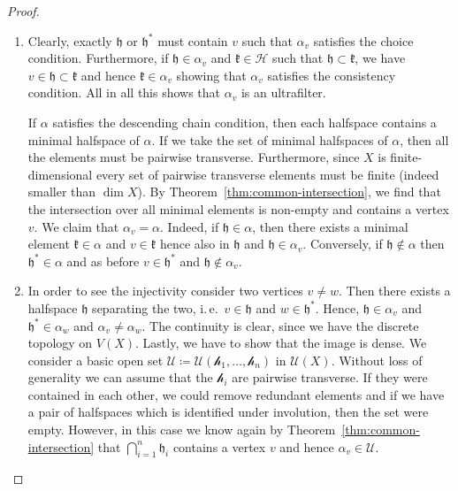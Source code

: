 \begin{proof}
  \begin{enumerate}
  \item Clearly, exactly \(\mathfrak{h}\) or \(\mathfrak{h}^\ast\) must contain \(v\) such that \(\alpha_v\) satisfies the choice condition. Furthermore, if \(\mathfrak{h} \in \alpha_v\) and \(\mathfrak{k} \in \mathcal{H}\) such that \(\mathfrak{h} \subset \mathfrak{k}\), we have \(v \in \mathfrak{h} \subset \mathfrak{k}\) and hence \(\mathfrak{k} \in \alpha_v\) showing that \(\alpha_v\) satisfies the consistency condition. All in all this shows that \(\alpha_v\) is an ultrafilter.

    If \(\alpha\) satisfies the descending chain condition, then each halfspace contains a minimal halfspace of \(\alpha\). If we take the set of minimal halfspaces of \(\alpha\), then all the elements must be pairwise transverse. Furthermore, since \(X\) is finite-dimensional every set of pairwise transverse elements must be finite (indeed smaller than \(\dim X\)). By Theorem~\ref{thm:common-intersection}, we find that the intersection over all minimal elements is non-empty and contains a vertex \(v\). We claim that \(\alpha_v = \alpha\). Indeed, if \(\mathfrak{h} \in \alpha\), then there exists a minimal element \(\mathfrak{k} \in \alpha\) and \(v \in \mathfrak{k}\) hence also in \(\mathfrak{h}\) and \(\mathfrak{h} \in \alpha_v\). Conversely, if \(\mathfrak{h} \not \in \alpha\) then \(\mathfrak{h}^\ast \in \alpha\) and as before \(v \in \mathfrak{h}^\ast\) and \(\mathfrak{h} \not \in \alpha_v\).
  \item In order to see the injectivity consider two vertices \(v \neq w\). Then there exists a halfspace \(\mathfrak{h}\) separating the two, i.\,e.\ \(v \in \mathfrak{h}\) and \(w \in \mathfrak{h}^\ast\). Hence, \(\mathfrak{h} \in \alpha_v\) and \(\mathfrak{h}^\ast \in \alpha_w\) and \(\alpha_v \neq \alpha_w\). The continuity is clear, since we have the discrete topology on \(V(X)\). Lastly, we have to show that the image is dense. We consider a basic open set \(\mathcal{U} \coloneqq \mathcal{U}(\mathcal{h}_1, \dots, \mathcal{h}_n)\) in \(\mathcal{U}(X)\). Without loss of generality we can assume that the \(\mathcal{h}_i\) are pairwise transverse. If they were contained in each other, we could remove redundant elements and if we have a pair of halfspaces which is identified under involution, then the set were empty. However, in this case we know again by Theorem~\ref{thm:common-intersection} that \(\bigcap_{i=1}^n \mathfrak{h}_i\) contains a vertex \(v\) and hence \(\alpha_v \in \mathcal{U}\).

\end{enumerate}
\end{proof}
